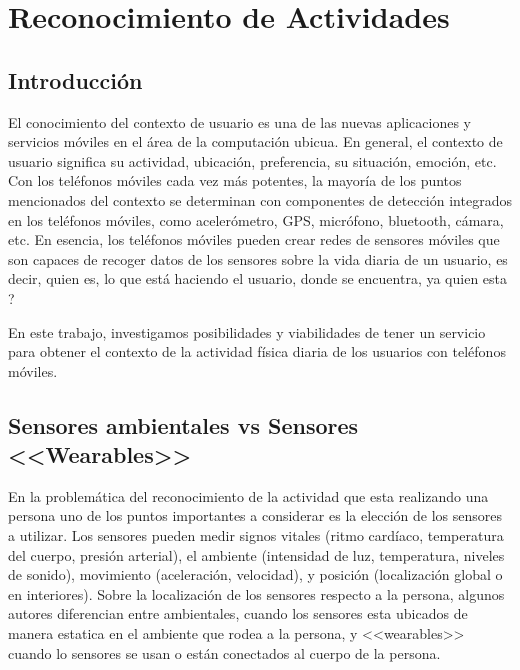 
\chapter{Reconocimiento de Actividades}

%

\section{Introducción}
El conocimiento del contexto de usuario es una de las nuevas aplicaciones y servicios móviles en el área de la computación ubicua.
En general, el contexto de usuario significa su actividad, ubicación, preferencia, su situación, emoción, etc. Con los teléfonos móviles cada vez más potentes, la mayoría de los puntos mencionados del contexto se determinan con componentes de detección integrados en los teléfonos móviles, como acelerómetro, GPS, micrófono, bluetooth, cámara, etc. En esencia, los teléfonos móviles pueden crear redes de sensores móviles que son capaces de recoger datos de los sensores sobre la vida diaria de un usuario, es decir, quien es, lo que está haciendo el usuario, donde se encuentra, ya quien esta ? 

En este trabajo, investigamos posibilidades y viabilidades de tener un servicio para obtener el contexto de la actividad física diaria de los usuarios con teléfonos móviles.

\section{Sensores ambientales vs Sensores <<Wearables>>}

En la problemática del reconocimiento de la actividad que esta realizando una persona uno de los puntos importantes a considerar es la elección de los sensores a utilizar. Los sensores pueden medir signos vitales (ritmo cardíaco, temperatura del cuerpo, presión arterial), el ambiente (intensidad de luz, temperatura, niveles de sonido), movimiento (aceleración, velocidad), y posición (localización global o en interiores).
Sobre la localización de los sensores respecto a la persona, algunos autores \cite{ReyesOrtiz2015} diferencian entre ambientales, cuando los sensores esta ubicados de manera estatica en el ambiente que rodea a la persona, y <<wearables>> cuando lo sensores se usan o están conectados al cuerpo de la persona.

